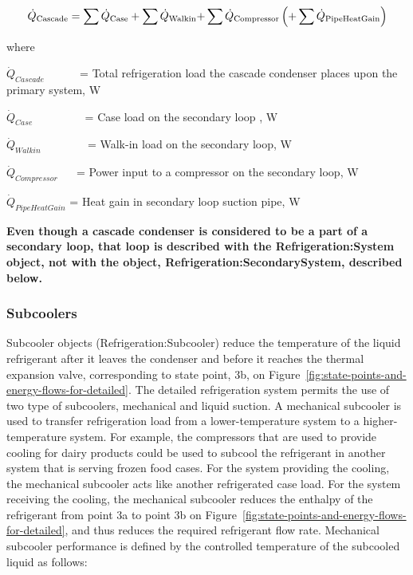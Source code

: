 \begin{equation}
{\dot Q_{{\rm{Cascade}}}} = {\sum {\dot Q}_{{\rm{Case}}}} + \sum {{{\dot Q}_{{\rm{Walkin}}}} + } \sum {{{\dot Q}_{{\rm{Compressor}}}}} \left( { + \sum {{{\dot Q}_{{\rm{PipeHeatGain}}}}} } \right)
\end{equation}

where

\({\dot Q_{Cascade}}\) ~~~~~ = Total refrigeration load the cascade condenser places upon the primary system, W

\({\dot Q_{Case}}\) ~~~~~~~~ = Case load on the secondary loop , W

\({\dot Q_{Walkin}}\) ~~~~~~~ = Walk-in load on the secondary loop, W

\({\dot Q_{Compressor}}\) ~~ = Power input to a compressor on the secondary loop, W

\({\dot Q_{PipeHeatGain}}\) = Heat gain in secondary loop suction pipe, W

\textbf{Even though a cascade condenser is considered to be a part of a secondary loop, that loop is described with the Refrigeration:System object, not with the object, Refrigeration:SecondarySystem, described below.}

\subsubsection{Subcoolers}\label{subcoolers}

Subcooler objects (Refrigeration:Subcooler) reduce the temperature of the liquid refrigerant after it leaves the condenser and before it reaches the thermal expansion valve, corresponding to state point, 3b, on Figure~\ref{fig:state-points-and-energy-flows-for-detailed}. The detailed refrigeration system permits the use of two type of subcoolers, mechanical and liquid suction. A mechanical subcooler is used to transfer refrigeration load from a lower-temperature system to a higher-temperature system. For example, the compressors that are used to provide cooling for dairy products could be used to subcool the refrigerant in another system that is serving frozen food cases. For the system providing the cooling, the mechanical subcooler acts like another refrigerated case load. For the system receiving the cooling, the mechanical subcooler reduces the enthalpy of the refrigerant from point 3a to point 3b on Figure~\ref{fig:state-points-and-energy-flows-for-detailed}, and thus reduces the required refrigerant flow rate. Mechanical subcooler performance is defined by the controlled temperature of the subcooled liquid as follows:

